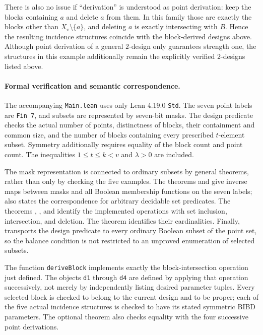 \documentclass[10pt]{article}
\begin{document}
There is also no issue if ``derivation'' is understood as point derivation: keep the blocks containing $a$ and delete $a$ from them. In this family those are exactly the blocks other than $X_v\setminus\{a\}$, and deleting $a$ is exactly intersecting with $B$. Hence the resulting incidence structures coincide with the block-derived designs above. Although point derivation of a general $2$-design only guarantees strength one, the structures in this example additionally remain the explicitly verified $2$-designs listed above.
\newpage
\paragraph{Formal verification and semantic correspondence.}
The accompanying \texttt{Main.lean} uses only Lean 4.19.0 \texttt{Std}. The seven point labels are \texttt{Fin 7}, and subsets are represented by seven-bit masks. The design predicate checks the actual number of points, distinctness of blocks, their containment and common size, and the number of blocks containing every prescribed $t$-element subset. Symmetry additionally requires equality of the block count and point count. The inequalities $1\le t\le k<v$ and $\lambda>0$ are included.

The mask representation is connected to ordinary subsets by general theorems, rather than only by checking the five examples. The theorems  and  give inverse maps between masks and all Boolean membership functions on the seven labels;  also states the correspondence for arbitrary decidable set predicates. The theorems , , and  identify the implemented operations with set inclusion, intersection, and deletion. The theorem  identifies their cardinalities. Finally,  transports the design predicate to every ordinary Boolean subset of the point set, so the balance condition is not restricted to an unproved enumeration of selected subsets.

The function \texttt{deriveBlock} implements exactly the block-intersection operation just defined. The objects \texttt{d1} through \texttt{d4} are defined by applying that operation successively, not merely by independently listing desired parameter tuples. Every selected block is checked to belong to the current design and to be proper; each of the five actual incidence structures is checked to have its stated symmetric BIBD parameters. The optional theorem  also checks equality with the four successive point derivations.
\end{document}
